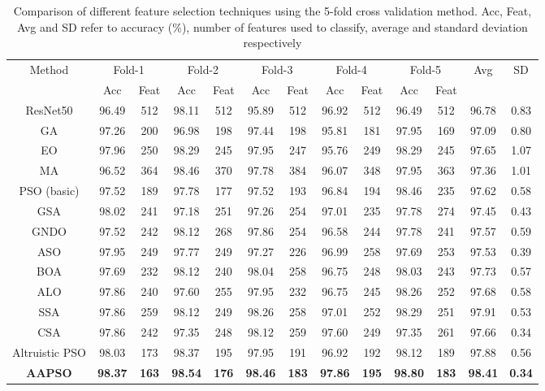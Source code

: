 \documentclass[final,3p,times]{elsarticle}
\begin{document}
\begin{table*}[ht!]
    \centering
    \caption{Comparison of different feature selection techniques using the 5-fold cross validation method. Acc, Feat, Avg and SD refer to accuracy (\%), number of features used to classify, average and standard deviation respectively}
    \begin{tabular}{c|cc|cc|cc|cc|cc|cc}
        \toprule 
        \multirow{2}{*}{Method} & \multicolumn{2}{c|}{Fold-1} & \multicolumn{2}{c|}{Fold-2} & \multicolumn{2}{c|}{Fold-3} & \multicolumn{2}{c|}{Fold-4} & \multicolumn{2}{c|}{Fold-5} & \multirow{2}{*}{Avg} &\multirow{2}{*}{SD} \\
        \cmidrule{2-11}
        & Acc & Feat& Acc & Feat& Acc & Feat& Acc & Feat& Acc & Feat\\
        \midrule
        ResNet50 & 96.49 & 512 &98.11 & 512 & 95.89 & 512 & 96.92 & 512 & 96.49 &512 & 96.78 & 0.83\\
        \midrule
        GA & 97.26 & 200 & 96.98 & 198 & 97.44 & 198 & 95.81 & 181 & 97.95 &169 & 97.09 & 0.80\\
        EO & 97.96 & 250 & 98.29 & 245 & 97.95 & 247 & 95.76 & 249 & 98.29 & 245 & 97.65 & 1.07\\
        MA & 96.52 & 364 & 98.46 & 370 & 97.78 & 384 & 96.07 & 348 & 97.95 & 363 & 97.36 & 1.01\\
        PSO (basic) & 97.52 &189 & 97.78 & 177 & 97.52 &193 &96.84& 194 & 98.46 & 235 & 97.62 & 0.58\\
        GSA & 98.02 &241 &97.18 &251 & 97.26 &254 &97.01 & 235 & 97.78 &274 & 97.45 & 0.43\\
        {GNDO} & 97.52 & 242 & 98.12 & 268 & 97.86 & 254 & 96.58 & 244 & 97.78 & 241 & 97.57 & 0.59\\
        {ASO} & 97.95 & 249 & 97.77 & 249 & 97.27 & 226 & 96.99 & 258 & 97.69 & 253 & 97.53 & 0.39\\
        {BOA} & 97.69 & 232 & 98.12 & 240 & 98.04 & 258 & 96.75 & 248 & 98.03 & 243 & 97.73 & 0.57\\
        {ALO} & 97.86 & 240 & 97.60 & 255 & 97.95 & 232 & 96.75 & 245 & 98.26 & 252 & 97.68 & 0.58\\
        {SSA} & 97.86 & 259 & 98.12 & 249 & 98.26 & 258 & 97.01 & 252 & 98.29 & 251 & 97.91 & 0.53\\
        {CSA} & 97.86 & 242 & 97.35 & 248 & 98.12 & 259 & 97.60 & 249 & 97.35 & 261 & 97.66 & 0.34\\
        \midrule
    Altruistic PSO & 98.03 & 173 & 98.37 & 195 & 97.95 & 191 & 96.92 & 192 & 98.12 & 189 & 97.88 & 0.56\\
        \textbf{AAPSO} & \textbf{98.37} & \textbf{163} & \textbf{98.54} & \textbf{176} & \textbf{98.46} & \textbf{183} & \textbf{97.86} & \textbf{195} & \textbf{98.80} & \textbf{183} & \textbf{98.41} & \textbf{0.34}\\
        \bottomrule
    \end{tabular}
    \label{tab:compfs}
\end{table*}
\end{document}
